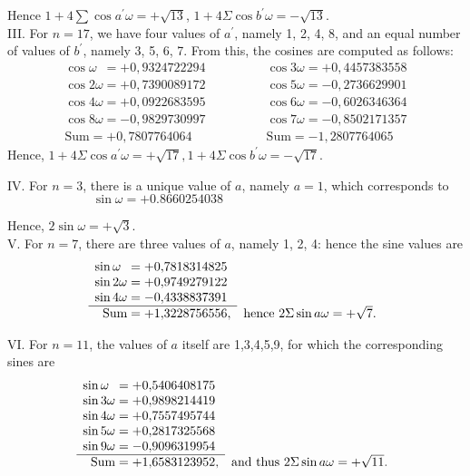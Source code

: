 \documentclass[twoside,12pt, showframe]{memoir}
\begin{document}
Hence \(1+4 \sum \cos a^{\prime} \omega=+\sqrt{13}\), \(1+4 \Sigma \cos b^{\prime} \omega=-\sqrt{13}\).\\
%

III. For \(n=17\), we have four values of \(a^\prime\), namely 1, 2, 4, 8, and an equal number of values of \(b^\prime\), namely 3, 5, 6, 7. From this, the cosines are computed as follows:
\[\begin{array}{r}
\cos \omega\phantom{1}  =+0{,}9324722294 \\
\cos 2 \omega  =+0{,}7390089172 \\
\cos 4 \omega  =+0{,}0922683595 \\
\cos 8 \omega  =-0{,}9829730997 \\
\hline \text{Sum} =+0{,}7807764064 
\end{array}
\qquad \qquad
\begin{array}{r}
\cos 3 \omega  =+0{,}4457383558 \\
\cos 5 \omega  =-0{,}2736629901 \\
\cos 6 \omega  =-0{,}6026346364 \\
\cos 7 \omega  =-0{,}8502171357 \\
\hline \text{Sum} =-1{,}2807764065
\end{array}\]
Hence, \(1+4 \Sigma \cos a^{\prime} \omega=+\sqrt{17},1+4 \Sigma \cos b^{\prime} \omega=-\sqrt{17}\).
%

IV. For \(n=3\), there is a unique value of \(a\), namely \(a=1\), which corresponds to 
\[\sin \omega=+0.8660254038 \quad\quad \phantom{\sin \omega=+0.8660254038}\]
 
Hence, \(2 \sin \omega=+\sqrt{3}\).\\
%

V. For \(n=7\), there are three values of \(a\), namely 1, 2, 4: hence the sine values are
\[\begin{array}{rl}
 \sin \omega\phantom{1} =+0{,}7818314825 \phantom{,}&\\
\sin 2 \omega  =+0{,}9749279122 \phantom{,}&\\
\sin 4 \omega  =-0{,}4338837391 \phantom{,}&\\
\cline{1-1} \text{Sum}  =+1{,}3228756556,& \text{hence } 2 \Sigma \sin a \omega=+\sqrt{7}.
\end{array}\]
%

VI. For \(n=11\), the values of \(a\) itself are 1,3,4,5,9, for which the corresponding sines are
\[\begin{array}{rl}
\sin \omega\phantom{1}  =+0{,}5406408175 \phantom{,}&\\
\sin 3 \omega  =+0{,}9898214419 \phantom{,}&\\
\sin 4 \omega  =+0{,}7557495744 \phantom{,}&\\
\sin 5 \omega  =+0{,}2817325568 \phantom{,}&\\
\sin 9 \omega  =-0{,}9096319954 \phantom{,}&\\
\cline{1-1} \text{Sum} =+1{,}6583123952,& \text{and thus } 2 \Sigma \sin a \omega=+\sqrt{11}.
\end{array}\]
%
\end{document}
